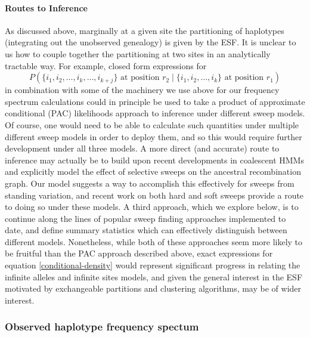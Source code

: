 \documentclass[a4paper,10pt]{article}
\begin{document}
\paragraph{Routes to Inference}
As discussed above, marginally at a given site the partitioning of haplotypes (integrating out the unobserved genealogy) is given by the ESF. It is unclear to us how to couple together the partitioning at two sites in an analytically tractable way. For example, closed form expressions for 
\begin{equation}
	P\left(\{i_1,i_2,\dots,i_k,\dots,i_{k+j}\} \text{ at position } r_2 \mid \{i_1,i_2,\dots,i_k\} \text{ at position } r_1 \right) \label{conditional-density}
\end{equation}
in combination with some of the machinery we use above for our frequency spectrum calculations could in principle be used to take a product of approximate conditional (PAC) likelihoods approach to inference under different sweep models. Of course, one would need to be able to calculate such quantities under multiple different sweep models in order to deploy them, and so this would require further development under all three models. A more direct (and accurate) route to inference may actually be to build upon recent developments in coalescent HMMs \citep{coalHMM,psmc,dical,argweaver} and explicitly model the effect of selective sweeps on the ancestral recombination graph. Our model suggests a way to accomplish this effectively for sweeps from standing variation, and recent work on both hard and soft sweeps \citep{Barton1998,Durrett:2004fl,Durrett:2005fr,Schweinsberg:2005eh,Etheridge:2006fk,Hermisson2008,Messer:2012ie} provide a route to doing so under these models. A third approach, which we explore below, is to continue along the lines of popular sweep finding approaches implemented to date, and define summary statistics which can effectively distinguish between different models. Nonetheless, while both of these approaches seem more likely to be fruitful than the PAC approach described above, exact expressions for equation \eqref{conditional-density} would represent significant progress in relating the infinite alleles and infinite sites models, and given the general interest in the ESF motivated by exchangeable partitions and clustering algorithms, may be of wider interest.
 
\subsubsection*{Observed haplotype frequency spectum}
\end{document}
